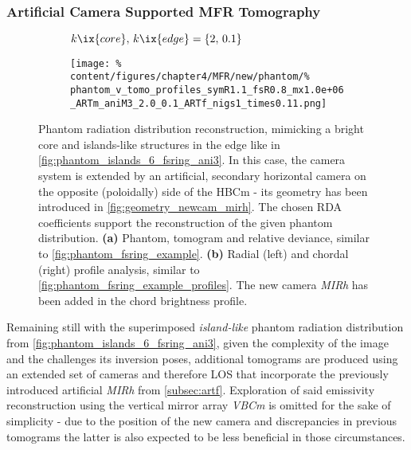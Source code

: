             \subsubsection*{Artificial Camera Supported MFR Tomography}%
%
                \begin{figure}[t]%
                    \centering%
                    \begin{subfigure}{\textwidth}%
                        \centering%
                        \caption{$k\ix{core},\,k\ix{edge}=\left\{2,\,0.1\right\}$}%
                    \end{subfigure}%
                    \newline%
                    \begin{subfigure}{\textwidth}%
                        \centering%
                        \texttt{[image: \%
                            content/figures/chapter4/MFR/new/phantom/\%
                            phantom\_v\_tomo\_profiles\_symR1.1\_fsR0.8\_mx1.0e+06\_ARTm\_aniM3\_2.0\_0.1\_ARTf\_nigs1\_times0.11.png]}%
                        \caption{}%
                    \end{subfigure}%
                    \caption{Phantom radiation distribution reconstruction, mimicking a bright core and islands-like structures in the edge like in \cref{fig:phantom_islands_6_fsring_ani3}. In this case, the camera system is extended by an artificial, secondary horizontal camera on the opposite (poloidally) side of the HBCm - its geometry has been introduced in \cref{fig:geometry_newcam_mirh}. The chosen RDA coefficients support the reconstruction of the given phantom distribution. \textbf{(a)} Phantom, tomogram and relative deviance, similar to \cref{fig:phantom_fsring_example}. \textbf{(b)} Radial (left) and chordal (right) profile analysis, similar to \cref{fig:phantom_fsring_example_profiles}. The new camera \textit{MIRh} has been added in the chord brightness profile.}\label{fig:phantom_islands_6_fsring_ARTm}%
                \end{figure}%
%
                Remaining still with the superimposed \textit{island-like} phantom radiation distribution from \cref{fig:phantom_islands_6_fsring_ani3}, given the complexity of the image and the challenges its inversion poses, additional tomograms are produced using an extended set of cameras and therefore LOS that incorporate the previously introduced artificial \textit{MIRh} from \cref{subsec:artf}. Exploration of said emissivity reconstruction using the vertical mirror array \textit{VBCm} is omitted for the sake of simplicity - due to the position of the new camera and discrepancies in previous tomograms the latter is also expected to be less beneficial in those circumstances.\\%

